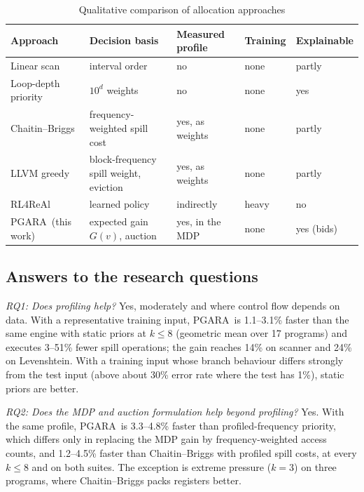 \documentclass{ieeeaccess}
\newcommand{\MG}{PGARA}
\begin{document}
\begin{table}[t]
\centering
\caption{Qualitative comparison of allocation approaches}
\label{tab:compare}
\footnotesize
\setlength{\tabcolsep}{2.5pt}
\begin{tabular}{@{}>{\raggedright}p{20mm}>{\raggedright}p{22mm}>{\raggedright}p{14mm}>{\raggedright}p{9mm}>{\raggedright\arraybackslash}p{10mm}@{}}
\toprule
Approach & Decision basis & Measured profile & Training & Explain\-able \\
\midrule
Linear scan~\cite{poletto1999} & interval order & no & none & partly \\
Loop-depth priority~\cite{chow1990} & $10^{d}$ weights & no & none & yes \\
Chaitin--Briggs~\cite{briggs1994} & frequency-weighted spill cost & yes, as weights & none & partly \\
LLVM greedy~\cite{olesen2011greedy} & block-frequency spill weight, eviction & yes, as weights & none & partly \\
RL4ReAl~\cite{venkatakeerthy2023rl4real} & learned policy & indirectly & heavy & no \\
\MG\ (this work) & expected gain $G(v)$, auction & yes, in the MDP & none & yes (bids) \\
\bottomrule
\end{tabular}
\end{table}

\subsection{Answers to the research questions}
\label{sec:rq}

\textit{RQ1: Does profiling help?} Yes, moderately and where control
flow depends on data. With a representative training input, \MG\ is
1.1--3.1\% faster than the same engine with static priors at $k\le8$
(geometric mean over 17 programs) and executes 3--51\% fewer spill
operations; the gain reaches 14\% on scanner and 24\% on Levenshtein.
With a training input whose branch behaviour differs strongly from the
test input (above about 30\% error rate where the test has 1\%),
static priors are better.

\textit{RQ2: Does the MDP and auction formulation help beyond
profiling?} Yes. With the same profile, \MG\ is 3.3--4.8\% faster than
profiled-frequency priority, which differs only in replacing the MDP
gain by frequency-weighted access counts, and 1.2--4.5\% faster than
Chaitin--Briggs with profiled spill costs, at every $k\le8$ and on both
suites. The exception is extreme pressure ($k=3$) on three programs,
where Chaitin--Briggs packs registers better.
\end{document}
